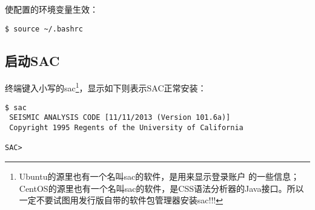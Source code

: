 使配置的环境变量生效：
\begin{lstlisting}[style=Shell]
$ source ~/.bashrc
\end{lstlisting}

\subsection*{启动SAC}
终端键入小写的sac\footnote{Ubuntu的源里也有一个名叫sac的软件，是用来显示登录账户
的一些信息；CentOS的源里也有一个名叫sac的软件，是CSS语法分析器的Java接口。所以
一定不要试图用发行版自带的软件包管理器安装sac!!!}，显示如下则表示SAC正常安装：
\begin{lstlisting}[style=Shell]
$ sac
 SEISMIC ANALYSIS CODE [11/11/2013 (Version 101.6a)]
 Copyright 1995 Regents of the University of California

SAC> 
\end{lstlisting}
